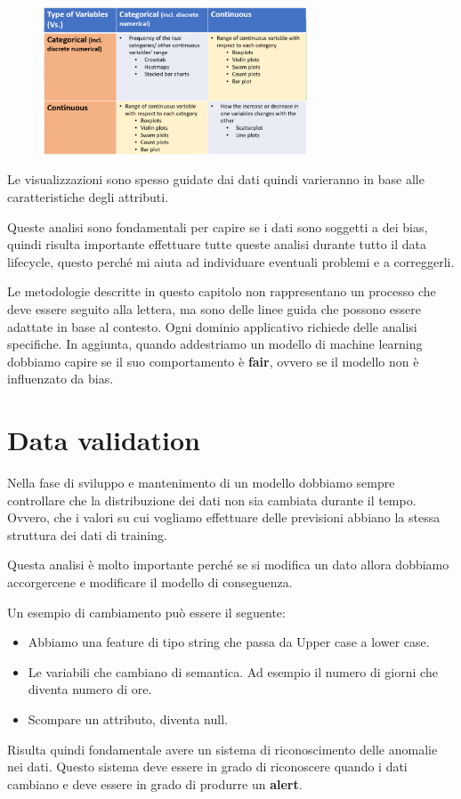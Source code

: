 \begin{figure}[!h]
      \centering
      \includegraphics[width=0.7\textwidth]{img/MLops/exploration.png}
\end{figure}

Le visualizzazioni sono spesso guidate dai dati quindi varieranno in base alle
caratteristiche degli attributi.

Queste analisi sono fondamentali per capire se i dati sono soggetti a dei bias,
quindi risulta importante effettuare tutte queste analisi durante tutto il data lifecycle,
questo perché mi aiuta ad individuare eventuali problemi e a correggerli.

Le metodologie descritte in questo capitolo non rappresentano un processo che deve
essere seguito alla lettera, ma sono delle linee guida che possono essere adattate
in base al contesto. Ogni dominio applicativo richiede delle analisi specifiche.
In aggiunta, quando addestriamo un modello di machine learning dobbiamo capire se
il suo comportamento è \textbf{fair}, ovvero se il modello non è influenzato da
bias.
\section{Data validation}
Nella fase di sviluppo e mantenimento di un modello dobbiamo sempre controllare
che la distribuzione dei dati non sia cambiata durante il tempo.
Ovvero, che i valori su cui vogliamo effettuare delle previsioni abbiano la stessa
struttura dei dati di training.

Questa analisi è molto importante perché se si modifica un dato allora dobbiamo
accorgercene e modificare il modello di conseguenza.

Un esempio di cambiamento può essere il seguente:
\begin{itemize}
      \item Abbiamo una feature di tipo string che passa da Upper case a lower case.
      \item Le variabili che cambiano di semantica. Ad esempio il numero di giorni
            che diventa numero di ore.
      \item Scompare un attributo, diventa null.
\end{itemize}
Risulta quindi fondamentale avere un sistema di riconoscimento delle anomalie
nei dati. Questo sistema deve essere in grado di riconoscere quando i dati cambiano
e deve essere in grado di produrre un \textbf{alert}.

